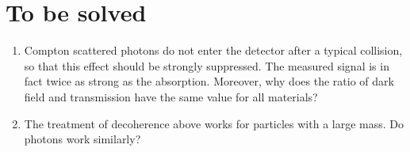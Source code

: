 \section{To be solved}
\begin{enumerate}
\item Compton scattered photons do not enter the detector after a typical collision, so that this effect should be strongly suppressed. The measured signal is in fact twice as strong as the absorption. Moreover, why does the ratio of dark field and transmission have the same value for all materials?
\item The treatment of decoherence above works for particles with a large mass. Do photons work similarly?
\end{enumerate}